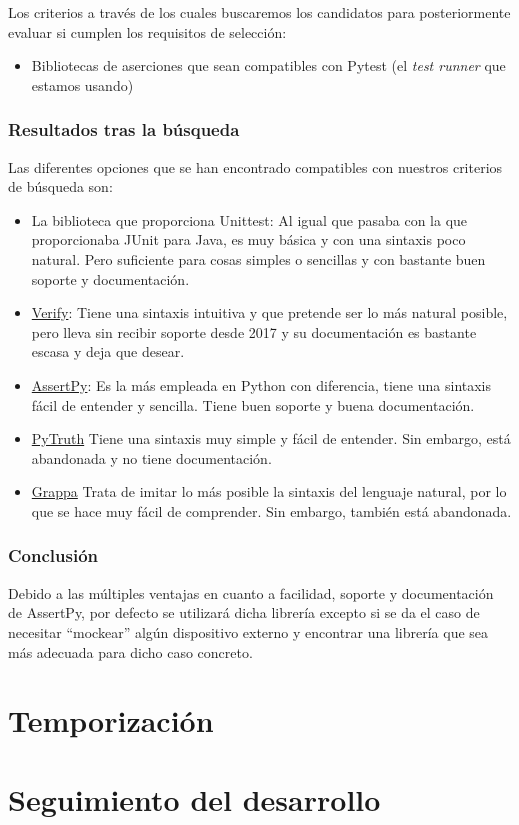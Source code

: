 Los criterios a través de los cuales buscaremos los candidatos para
posteriormente evaluar si cumplen los requisitos de selección:
\begin{itemize}
    \item Bibliotecas de aserciones que sean compatibles con Pytest (el
    \emph{test runner} que estamos usando)
\end{itemize}

\subsubsection{Resultados tras la búsqueda}

Las diferentes opciones que se han encontrado compatibles con nuestros criterios
de búsqueda son:

\begin{itemize}
    \item La biblioteca que proporciona Unittest: Al igual que pasaba con la que
    proporcionaba JUnit para Java, es muy básica y con una sintaxis poco
    natural. Pero suficiente para cosas simples o sencillas y con bastante buen
    soporte y documentación.
    \item \href{https://github.com/dgilland/verify}{Verify}: Tiene una sintaxis
    intuitiva y que pretende ser lo más natural posible, pero lleva sin recibir
    soporte desde 2017 y su documentación es bastante escasa y deja que desear.
    \item \href{https://github.com/assertpy/assertpy}{AssertPy}: Es la más empleada
    en Python con diferencia, tiene una sintaxis fácil de entender y sencilla.
    Tiene buen soporte y buena documentación.
    \item \href{https://github.com/google/pytruth}{PyTruth} Tiene una sintaxis
    muy simple y fácil de entender. Sin embargo, está abandonada y no tiene
    documentación.
    \item \href{https://github.com/grappa-py/grappa}{Grappa} Trata de imitar lo
    más posible la sintaxis del lenguaje natural, por lo que se hace muy fácil
    de comprender. Sin embargo, también está abandonada.
\end{itemize}

\subsubsection{Conclusión}

Debido a las múltiples ventajas en cuanto a facilidad, soporte y documentación
de AssertPy, por defecto se utilizará dicha librería excepto si se da el caso de
necesitar ``mockear'' algún dispositivo externo y encontrar una librería que sea
más adecuada para dicho caso concreto.


\section{Temporización}

\section{Seguimiento del desarrollo}
